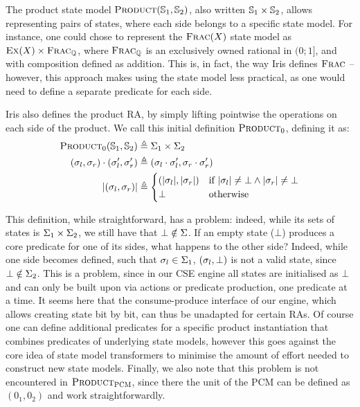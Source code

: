 The product state model $\textsc{Product}(\mathbb S_1, \mathbb S_2)$, also written $\mathbb S_1 \times \mathbb S_2$, allows representing pairs of states, where each side belongs to a specific state model. For instance, one could chose to represent the $\textsc{Frac}(X)$ state model as $\textsc{Ex}(X) \times \textsc{Frac}_{\mathbb{Q}}$, where $\textsc{Frac}_{\mathbb{Q}}$ is an exclusively owned rational in $(0;1]$, and with composition defined as addition. This is, in fact, the way Iris defines $\textsc{Frac}$ \cite{iris-thesis} -- however, this approach makes using the state model less practical, as one would need to define a separate predicate for each side.

Iris also defines the product RA, by simply lifting pointwise the operations on each side of the product. We call this initial definition $\textsc{Product}_0$, defining it as: \begin{align*}
 	\textsc{Product}_0(\mathbb S_1,\mathbb S_2)&\triangleq \Sigma_1 \times \Sigma_2\\
 	(\sigma_l,\sigma_r)\cdot(\sigma_l',\sigma_r') &\triangleq (\sigma_l\cdot \sigma_l',\sigma_r\cdot \sigma_r')\\
 	|(\sigma_l,\sigma_r)|&\triangleq \begin{cases}
(|\sigma_l|, |\sigma_r|) &\text{if}~|\sigma_l|\neq\bot \land |\sigma_r|\neq\bot\\
\bot&\text{otherwise}
\end{cases}
\end{align*}

This definition, while straightforward, has a problem: indeed, while its sets of states is $\Sigma_1\times\Sigma_2$, we still have that $\bot\notin\Sigma$. If an empty state ($\bot$) produces a core predicate for one of its sides, what happens to the other side? Indeed, while one side becomes defined, such that $\sigma_l\in\Sigma_1$, $(\sigma_l, \bot)$ is not a valid state, since $\bot \notin \Sigma_2$. This is a problem, since in our CSE engine all states are initialised as $\bot$ and can only be built upon via actions or predicate production, one predicate at a time. It seems here that the consume-produce interface of our engine, which allows creating state bit by bit, can thus be unadapted for certain RAs. Of course one can define additional predicates for a specific product instantiation that combines predicates of underlying state models, however this goes against the core idea of state model transformers to minimise the amount of effort needed to construct new state models. Finally, we also note that this problem is not encountered in $\textsc{Product}_{\textsc{PCM}}$, since there the unit of the PCM can be defined as $(0_1, 0_2)$ and work straightforwardly.

